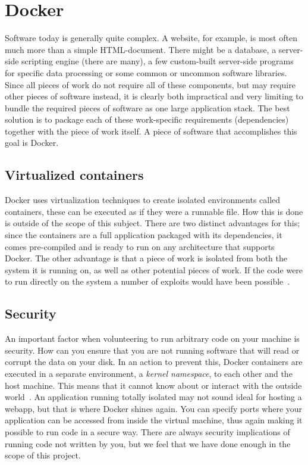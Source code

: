 \section{Docker}
Software today is generally quite complex. A website, for example, is most often much more than a simple HTML-document. There might be a database, a server-side scripting engine (there are many), a few custom-built server-side programs for specific data processing or some common or uncommon software libraries. Since all pieces of work do not require all of these components, but may require other pieces of software instead, it is clearly both impractical and very limiting to bundle the required pieces of software as one large application stack. The best solution is to package each of these work-specific requirements (dependencies) together with the piece of work itself. A piece of software that accomplishes this goal is Docker.

\subsection{Virtualized containers}
Docker uses virtualization techniques to create isolated environments called containers, these can be executed as if they were a runnable file. How this is done is outside of the scope of this subject.
There are two distinct advantages for this; since the containers are a full application packaged with its dependencies, it comes pre-compiled and is ready to run on any architecture that supports Docker. 
The other advantage is that a piece of work is isolated from both the system it is running on, as well as other potential pieces of work. If the code were to run directly on the system a number of exploits would have been possible~\cite{korpela:2012}.

\subsection{Security}
An important factor when volunteering to run arbitrary code on your machine is security. 
How can you ensure that you are not running software that will read or corrupt the data on your disk. 
In an action to prevent this, Docker containers are executed in a separate environment, a \emph{kernel namespace}, to each other and the host machine. This means that it cannot know about or interact with the outside world~\cite{docker-security}. An application running totally isolated may not sound ideal for hosting a webapp, but that is where Docker shines again. You can specify ports where your application can be accessed from inside the virtual machine, thus again making it possible to run code in a secure way.
There are always security implications of running code not written by you, but we feel that we have done enough in the scope of this project.

